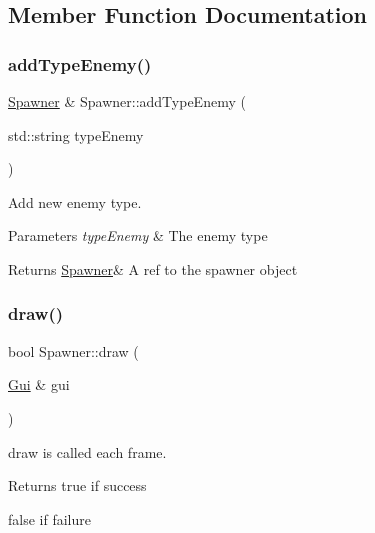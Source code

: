 \subsection{Member Function Documentation}
\mbox{\label{class_spawner_a6ecc83d8c8a0c357772b14a720876689}} 
\subsubsection{\texorpdfstring{add\+Type\+Enemy()}{addTypeEnemy()}}
{\footnotesize\ttfamily \hyperlink{class_spawner}{Spawner} \& Spawner\+::add\+Type\+Enemy (\begin{DoxyParamCaption}\item[{std\+::string}]{type\+Enemy }\end{DoxyParamCaption})}



Add new enemy type. 


\begin{DoxyParams}{Parameters}
{\em type\+Enemy} & The enemy type \\
\hline
\end{DoxyParams}
\begin{DoxyReturn}{Returns}
\hyperlink{class_spawner}{Spawner}\& A ref to the spawner object 
\end{DoxyReturn}
\mbox{\label{class_spawner_a1532fd875b6a3aacb617b1111b818f01}} 
\subsubsection{\texorpdfstring{draw()}{draw()}}
{\footnotesize\ttfamily bool Spawner\+::draw (\begin{DoxyParamCaption}\item[{\hyperlink{class_gui}{Gui} \&}]{gui }\end{DoxyParamCaption})\hspace{0.3cm}{\ttfamily [virtual]}}



draw is called each frame. 

\begin{DoxyReturn}{Returns}
true if success 

false if failure 
\end{DoxyReturn}


